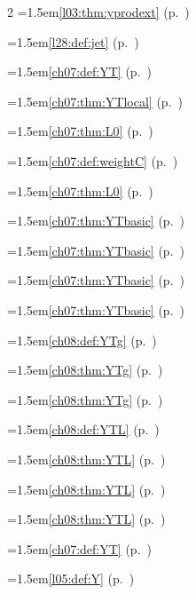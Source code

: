 \begin{multicols}{2}
\hangindent=1.5em\quad \ref{l03:thm:yprodext} (p.~\pageref{l03:thm:yprodext})\par
\hangindent=1.5em\quad \ref{l28:def:jet} (p.~\pageref{l28:def:jet})\par
\hangindent=1.5em\quad \ref{ch07:def:YT} (p.~\pageref{ch07:def:YT})\par
\hangindent=1.5em\quad \ref{ch07:thm:YTlocal} (p.~\pageref{ch07:thm:YTlocal})\par
\hangindent=1.5em\quad \ref{ch07:thm:L0} (p.~\pageref{ch07:thm:L0})\par
\hangindent=1.5em\quad \ref{ch07:def:weightC} (p.~\pageref{ch07:def:weightC})\par
\hangindent=1.5em\quad \ref{ch07:thm:L0} (p.~\pageref{ch07:thm:L0})\par
\hangindent=1.5em\quad \ref{ch07:thm:YTbasic} (p.~\pageref{ch07:thm:YTbasic})\par
\hangindent=1.5em\quad \ref{ch07:thm:YTbasic} (p.~\pageref{ch07:thm:YTbasic})\par
\hangindent=1.5em\quad \ref{ch07:thm:YTbasic} (p.~\pageref{ch07:thm:YTbasic})\par
\hangindent=1.5em\quad \ref{ch07:thm:YTbasic} (p.~\pageref{ch07:thm:YTbasic})\par
\hangindent=1.5em\quad \ref{ch08:def:YTg} (p.~\pageref{ch08:def:YTg})\par
\hangindent=1.5em\quad \ref{ch08:thm:YTg} (p.~\pageref{ch08:thm:YTg})\par
\hangindent=1.5em\quad \ref{ch08:thm:YTg} (p.~\pageref{ch08:thm:YTg})\par
\hangindent=1.5em\quad \ref{ch08:def:YTL} (p.~\pageref{ch08:def:YTL})\par
\hangindent=1.5em\quad \ref{ch08:thm:YTL} (p.~\pageref{ch08:thm:YTL})\par
\hangindent=1.5em\quad \ref{ch08:thm:YTL} (p.~\pageref{ch08:thm:YTL})\par
\hangindent=1.5em\quad \ref{ch08:thm:YTL} (p.~\pageref{ch08:thm:YTL})\par
\hangindent=1.5em\quad \ref{ch07:def:YT} (p.~\pageref{ch07:def:YT})\par
\hangindent=1.5em\quad \ref{l05:def:Y} (p.~\pageref{l05:def:Y})\par

\end{multicols}
